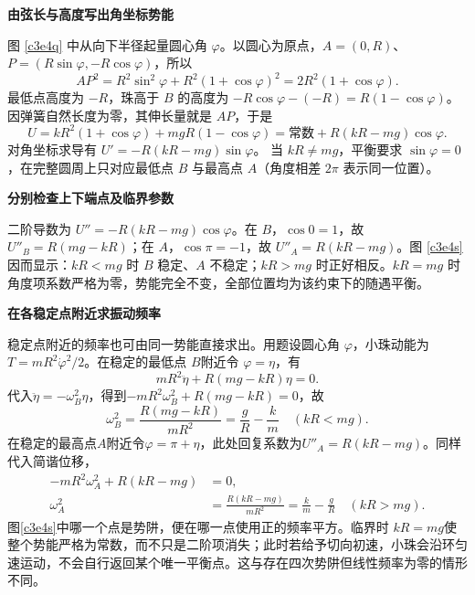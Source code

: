 \begin{solution}\textbf{由弦长与高度写出角坐标势能}\par\nobreak
图 \ref{c3e4q} 中从向下半径起量圆心角 $\varphi$。以圆心为原点，$A=(0,R)$、$P=(R\sin\varphi,-R\cos\varphi)$，所以
\[
 AP^2=R^2\sin^2\varphi+R^2(1+\cos\varphi)^2
 =2R^2(1+\cos\varphi).
\]
最低点高度为 $-R$，珠高于 $B$ 的高度为 $-R\cos\varphi-(-R)=R(1-\cos\varphi)$。因弹簧自然长度为零，其伸长量就是 $AP$，于是
\[
 U=kR^2(1+\cos\varphi)+mgR(1-\cos\varphi)
 =\text{常数}+R(kR-mg)\cos\varphi.
\]
对角坐标求导有
$U'=-R(kR-mg)\sin\varphi$。
当 $kR\ne mg$，平衡要求 $\sin\varphi=0$，在完整圆周上只对应最低点 $B$ 与最高点 $A$（角度相差 $2\pi$ 表示同一位置）。



\par\medskip{}\noindent\textbf{分别检查上下端点及临界参数}\par\nobreak
二阶导数为 $U''=-R(kR-mg)\cos\varphi$。在 $B$，$\cos0=1$，故 $U''_B=R(mg-kR)$；在 $A$，$\cos\pi=-1$，故 $U''_A=R(kR-mg)$。图 \ref{c3e4s} 因而显示：$kR<mg$ 时 $B$ 稳定、$A$ 不稳定；$kR>mg$ 时正好相反。$kR=mg$ 时角度项系数严格为零，势能完全不变，全部位置均为该约束下的随遇平衡。


\par\medskip{}\noindent\textbf{在各稳定点附近求振动频率}\par\nobreak
稳定点附近的频率也可由同一势能直接求出。用题设圆心角 $\varphi$，小珠动能为 $T=mR^2\dot\varphi^2/2$。在稳定的最低点 $B$附近令 $\varphi=\eta$，有
\[mR^2\ddot\eta+R(mg-kR)\eta=0.\]
代入$\ddot\eta=-\omega_B^2\eta$，得到$-mR^2\omega_B^2+R(mg-kR)=0$，故
\[\omega_B^2=\frac{R(mg-kR)}{mR^2}
=\frac gR-\frac km\quad(kR<mg).\]
在稳定的最高点$A$附近令$\varphi=\pi+\eta$，此处回复系数为$U''_A=R(kR-mg)$。同样代入简谐位移，
\begin{align*}
-mR^2\omega_A^2+R(kR-mg)&=0,\\
\omega_A^2&=\frac{R(kR-mg)}{mR^2}
=\frac km-\frac gR\quad(kR>mg).
\end{align*}
图\ref{c3e4s}中哪一个点是势阱，便在哪一点使用正的频率平方。临界时 $kR=mg$使整个势能严格为常数，而不只是二阶项消失；此时若给予切向初速，小珠会沿环匀速运动，不会自行返回某个唯一平衡点。这与存在四次势阱但线性频率为零的情形不同。
\end{solution}

